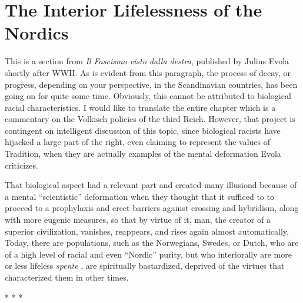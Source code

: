 \section{The Interior Lifelessness of the Nordics}

This is a section from \textit{Il Fascismo visto dalla destra}, published by Julius Evola shortly after WWII. As is evident from this paragraph, the process of decay, or progress, depending on your perspective, in the Scandinavian countries, has been going on for quite some time. Obviously, this cannot be attributed to biological racial characteristics. I would like to translate the entire chapter which is a commentary on the Volkisch policies of the third Reich. However, that project is contingent on intelligent discussion of this topic, since biological racists have hijacked a large part of the right, even claiming to represent the values of Tradition, when they are actually examples of the mental deformation Evola criticizes.


\begin{quotex}
That biological aspect had a relevant part and created many illusiond because of a mental ``scientistic'' deformation when they thought that it sufficed to to proceed to a prophylaxis and erect barriers against crossing and hybridism, along with more eugenic measures, so that by virtue of it, man, the creator of a superior civilization, vanishes, reappears, and rises again almost automatically. Today, there are populations, such as the Norwegians, Swedes, or Dutch, who are of a high level of racial and even ``Nordic'' purity, but who interiorally are more or less lifeless \emph{spente} , are spiritually bastardized, deprived of the virtues that characterized them in other times.
\end{quotex}




\begin{center}* * *\end{center}

